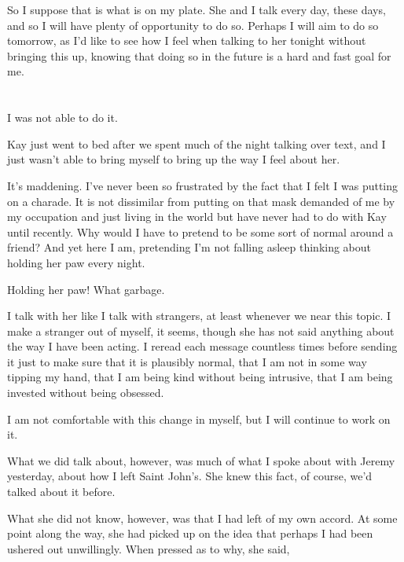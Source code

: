 So I suppose that is what is on my plate. She and I talk every day, these days, and so I will have plenty of opportunity to do so. Perhaps I will aim to do so tomorrow, as I'd like to see how I feel when talking to her tonight without bringing this up, knowing that doing so in the future is a hard and fast goal for me.

\section{}

I was not able to do it.

Kay just went to bed after we spent much of the night talking over text, and I just wasn't able to bring myself to bring up the way I feel about her.

It's maddening. I've never been so frustrated by the fact that I felt I was putting on a charade. It is not dissimilar from putting on that mask demanded of me by my occupation and just living in the world but have never had to do with Kay until recently. Why would I have to pretend to be some sort of normal around a friend? And yet here I am, pretending I'm not falling asleep thinking about holding her paw every night.

Holding her paw! What garbage.

I talk with her like I talk with strangers, at least whenever we near this topic. I make a stranger out of myself, it seems, though she has not said anything about the way I have been acting. I reread each message countless times before sending it just to make sure that it is plausibly normal, that I am not in some way tipping my hand, that I am being kind without being intrusive, that I am being invested without being obsessed.

I am not comfortable with this change in myself, but I will continue to work on it.

What we did talk about, however, was much of what I spoke about with Jeremy yesterday, about how I left Saint John's. She knew this fact, of course, we'd talked about it before.

What she did not know, however, was that I had left of my own accord. At some point along the way, she had picked up on the idea that perhaps I had been ushered out unwillingly. When pressed as to why, she said,

\vspace{10pt}


